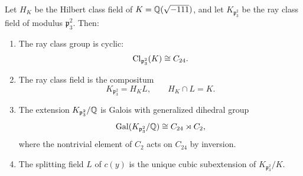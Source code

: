 \begin{theorem}\label{thm:ray-class}
Let \(H_K\) be the Hilbert class field of \(K=\mathbb{Q}(\sqrt{-111})\), and let \(K_{\mathfrak p_3^2}\) be the ray class field of modulus \(\mathfrak p_3^2\). Then:
\begin{enumerate}
\item[(i)] The ray class group is cyclic:
\[
\operatorname{Cl}_{\mathfrak p_3^2}(K)\cong C_{24}.
\]
\item[(ii)] The ray class field is the compositum
\[
K_{\mathfrak p_3^2}=H_KL,
\qquad
H_K\cap L=K.
\]
\item[(iii)] The extension \(K_{\mathfrak p_3^2}/\mathbb{Q}\) is Galois with generalized dihedral group
\[
\operatorname{Gal}(K_{\mathfrak p_3^2}/\mathbb{Q})\cong C_{24}\rtimes C_2,
\]
where the nontrivial element of \(C_2\) acts on \(C_{24}\) by inversion.
\item[(iv)] The splitting field \(L\) of \(c(y)\) is the unique cubic subextension of \(K_{\mathfrak p_3^2}/K\).
\end{enumerate}
\end{theorem}

